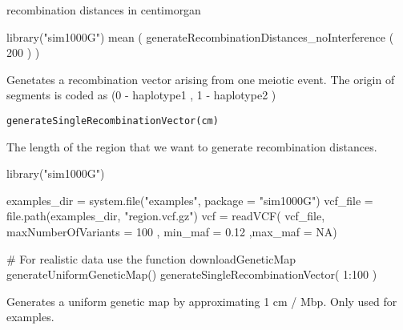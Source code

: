 \documentclass[letterpaper]{book}
\begin{document}
%
\begin{Value}
recombination distances in centimorgan
\end{Value}
%
\begin{Examples}
\begin{ExampleCode}

library("sim1000G")
mean ( generateRecombinationDistances_noInterference ( 200 ) )

\end{ExampleCode}
\end{Examples}
%
\begin{Description}\relax
Genetates a recombination vector arising from one meiotic event.
The origin of segments is coded as (0 - haplotype1 ,  1 - haplotype2 )
\end{Description}
%
\begin{Usage}
\begin{verbatim}
generateSingleRecombinationVector(cm)
\end{verbatim}
\end{Usage}
%
\begin{Arguments}
\begin{ldescription}
\item[\code{cm}] The length of the region that we want to generate recombination distances.
\end{ldescription}
\end{Arguments}
%
\begin{Examples}
\begin{ExampleCode}

library("sim1000G")

examples_dir = system.file("examples", package = "sim1000G")
vcf_file = file.path(examples_dir, "region.vcf.gz")
vcf = readVCF( vcf_file, maxNumberOfVariants = 100 ,
               min_maf = 0.12 ,max_maf = NA)

# For realistic data use the function downloadGeneticMap
generateUniformGeneticMap()
generateSingleRecombinationVector( 1:100 )

\end{ExampleCode}
\end{Examples}
%
\begin{Description}\relax
Generates a uniform genetic map by approximating 1 cm / Mbp. Only used for examples.
\end{Description}
\end{document}
